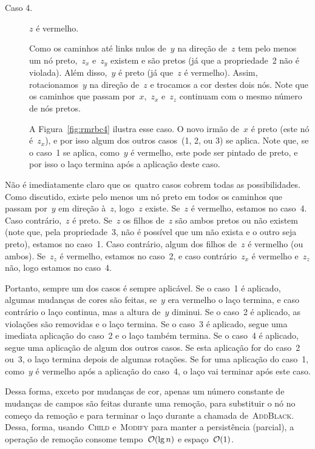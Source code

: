 \documentclass[../../main.tex]{subfiles}
\begin{document}
\begin{description}
	\item[Caso 4.] $z$ é vermelho.

	Como os caminhos até links nulos de~$y$ na direção de~$z$ tem pelo menos um nó preto,~$z_x$ e~$z_y$ existem e são pretos (já que a propriedade~2 não é violada). Além disso,~$y$ é preto (já que~$z$ é vermelho). Assim, rotacionamos~$y$ na direção de~$z$ e trocamos a cor destes dois nós. Note que os caminhos que passam por~$x$,~$z_x$ e~$z_z$ continuam com o mesmo número de nós pretos.

	A Figura~\ref{fig:rmrbc4} ilustra esse caso. O novo irmão de~$x$ é preto (este nó é~$z_x$), e por isso algum dos outros casos~(1, 2, ou 3) se aplica. Note que, se o caso~1 se aplica, como~$y$ é vermelho, este pode ser pintado de preto, e por isso o laço termina após a aplicação deste caso.


\end{description}

Não é imediatamente claro que os~quatro casos cobrem todas as possibilidades. Como discutido, existe pelo menos um nó preto em todos os caminhos que passam por~$y$ em direção à~$z$, logo~$z$ existe. Se~$z$ é vermelho, estamos no caso~4. Caso contrário,~$z$ é preto. Se~$z$ os filhos de~$z$ são ambos pretos ou não existem (note que, pela propriedade~3, não é possível que um não exista e o outro seja preto), estamos no caso~1. Caso contrário, algum dos filhos de~$z$ é vermelho (ou ambos). Se~$z_z$ é vermelho, estamos no caso~2, e caso contrário~$z_x$ é vermelho e~$z_z$ não, logo estamos no caso~4.

Portanto, sempre um dos casos é sempre aplicável. Se o caso~1 é aplicado, algumas mudanças de cores são feitas, se~$y$ era vermelho o laço termina, e caso contrário o laço continua, mas a altura de~$y$ diminui. Se o caso~2 é aplicado, as violações são removidas e o laço termina. Se o caso~3 é aplicado, segue uma imediata aplicação do caso~2 e o laço também termina. Se o caso~4 é aplicado, segue uma aplicação de algum dos outros casos. Se esta aplicação for do caso~2 ou~3, o laço termina depois de algumas rotações. Se for uma aplicação do caso~1, como~$y$ é vermelho após a aplicação do caso~4, o laço vai terminar após este caso.

Dessa forma, exceto por mudanças de cor, apenas um número constante de mudanças de campos são feitas durante uma remoção, para substituir o nó no começo da remoção e para terminar o laço durante a chamada de~\textsc{AddBlack}. Dessa, forma, usando~\textsc{Child} e~\textsc{Modify} para manter a persistência (parcial), a operação de remoção consome tempo~$\mathcal{O}(\lg n)$ e espaço~$\mathcal{O}(1)$.
\end{document}
